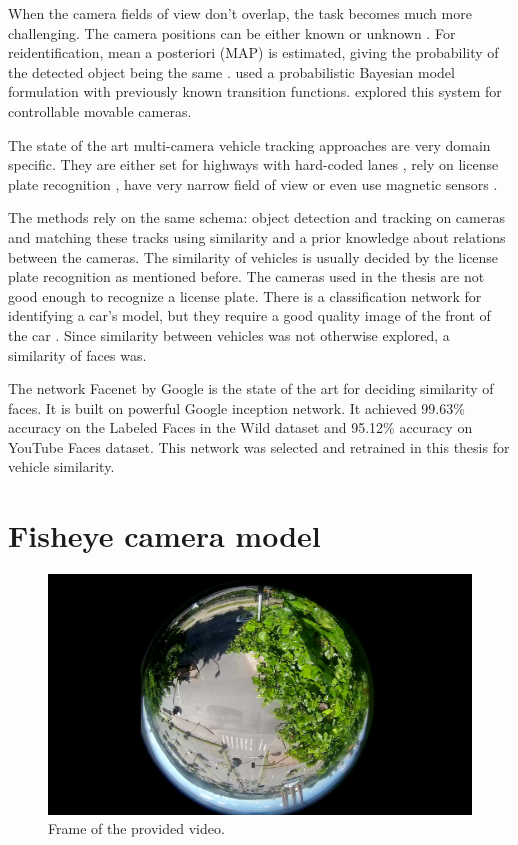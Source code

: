 \documentclass[a4paper,11pt,titlepage,twoside]{article}
\numberwithin{figure}{section}
\begin{document}
When the camera fields of view don't overlap, the task becomes much more challenging. The camera positions can be either known \cite{rahimi2004simultaneous} or unknown \cite{makris2004bridging}. For reidentification, mean a posteriori (MAP) is estimated, giving the probability of the detected object being the same \cite{javed2005appearance, huang1997object}. \cite{kettnaker1999bayesian} used a probabilistic Bayesian model formulation with previously known transition functions. \cite{kang2003continuous} explored this system for controllable movable cameras. 


The state of the art multi-camera vehicle tracking approaches are very domain specific. They are either set for highways with hard-coded lanes \cite{coifman2007vehicle, kuhne1991freeway}, rely on license plate recognition \cite{arth2007real, du2013automatic}, have very narrow field of view \cite{matei2011vehicle} or even use magnetic sensors \cite{kwong2009arterial}. 


The methods rely on the same schema: object detection and tracking on cameras and matching these tracks using similarity and a prior knowledge about relations between the cameras. The similarity of vehicles is usually decided by the license plate recognition as mentioned before. The cameras used in the thesis are not good enough to recognize a license plate. There is a classification network for identifying a car's model, but they require a good quality image of the front of the car \cite{munroe2005multi}. Since similarity between vehicles was not otherwise explored, a similarity of faces was.

The network Facenet \cite{schroff2015facenet} by Google is the state of the art for deciding similarity of faces. It is built on powerful Google inception \cite{szegedy2016rethinking} network. It achieved 99.63\% accuracy on the Labeled Faces in the Wild \cite{huang2007labeled} dataset and 95.12\% accuracy on YouTube Faces \cite{wolf2011face} dataset. This network was selected and retrained in this thesis for vehicle similarity. 


\clearpage
\section{Fisheye camera model}
\label{sec:lens}

\begin{figure}[h]
\centering
\includegraphics[width=1\linewidth]{fig/stream1.png}
\caption{Frame of the provided video.}
\label{fig:stream1}
\end{figure}
\end{document}
